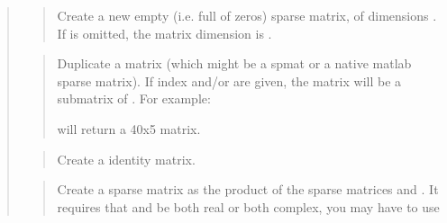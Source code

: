 \documentclass[a4paper,11pt,english]{sphinxmanual}
\begin{document}
\sphinxAtStartPar
{}
\begin{quote}

\sphinxAtStartPar
{}
\begin{quote}

\sphinxAtStartPar
Create a new empty (i.e. full of zeros) sparse matrix, of dimensions
. If  is omitted, the matrix dimension is .
\end{quote}

\sphinxAtStartPar
{}
\begin{quote}

\sphinxAtStartPar
Duplicate a matrix  (which might be a spmat or a native matlab
sparse matrix). If index  and/or  are given, the matrix will
be a submatrix of . For example:

\begin{sphinxVerbatim}[commandchars=\\\{\}]
     \PYG{p}{[}    \PYG{p}{]}
\end{sphinxVerbatim}

\sphinxAtStartPar
will return a 40x5 matrix.
\end{quote}

\sphinxAtStartPar
{}
\begin{quote}

\sphinxAtStartPar
Create a  identity matrix.
\end{quote}

\sphinxAtStartPar
{}
\begin{quote}

\sphinxAtStartPar
Create a sparse matrix as the product of the sparse matrices  and
. It requires that  and  be both real or both complex, you
may have to use 
\end{quote}


\end{quote}
\end{document}
